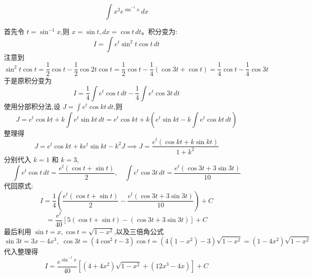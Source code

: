 \begin{questions}
    \question
    \[
    \int x^2 e^{\sin^{-1} x} \, dx
    \]
    \begin{solution}
        首先令 $t = \sin^{-1} x$,则 $x = \sin t, dx = \cos t \, dt$。积分变为:
        \[
        I = \int e^t \sin^2 t \cos t \, dt
        \]
        注意到
        \[
        \sin^2 t \cos t = \frac{1}{2} \cos t - \frac{1}{2} \cos 2t \cos t = \frac{1}{2} \cos t - \frac{1}{4} (\cos 3t + \cos t) = \frac{1}{4} \cos t - \frac{1}{4} \cos 3t
        \]
        于是原积分变为
        \[
        I = \frac{1}{4} \int e^t \cos t \, dt - \frac{1}{4} \int e^t \cos 3t \, dt
        \]
        使用分部积分法,设 $\displaystyle J = \int e^t \cos kt \, dt$,则
        \[
        J = e^t \cos kt + k \int e^t \sin kt \, dt = e^t \cos kt + k \left( e^t \sin kt - k \int e^t \cos kt \, dt \right)
        \]
        整理得
        \[
        J = e^t \cos kt + k e^t \sin kt - k^2 J \implies J = \frac{e^t ( \cos kt + k \sin kt )}{1+k^2}
        \]
        分别代入 $k=1$ 和 $k=3$,
        \[
        \int e^t \cos t \, dt = \frac{e^t (\cos t + \sin t)}{2},\quad \int e^t \cos 3t \, dt = \frac{e^t (\cos 3t + 3 \sin 3t)}{10}
        \]
        代回原式:
        \[
        I = \frac{1}{4} \left( \frac{e^t (\cos t + \sin t)}{2} - \frac{e^t (\cos 3t + 3 \sin 3t)}{10} \right) + C
        \]
        \[
        = \frac{e^t}{40} \left[ 5(\cos t + \sin t) - (\cos 3t + 3 \sin 3t) \right] + C
        \]
        最后利用 $\sin t = x, \cos t = \sqrt{1-x^2}$,以及三倍角公式
        \[
        \sin 3t = 3x - 4x^3, \; \cos 3t = (4 \cos^2 t - 3) \cos t = (4(1-x^2) - 3) \sqrt{1-x^2} = (1-4x^2) \sqrt{1-x^2}
        \]
        代入整理得
        \[
        I = \frac{e^{\sin^{-1} x}}{40} \left[ (4+4x^2)\sqrt{1-x^2} + (12x^3 - 4x) \right] + C
        \]
    \end{solution}


\end{questions}
